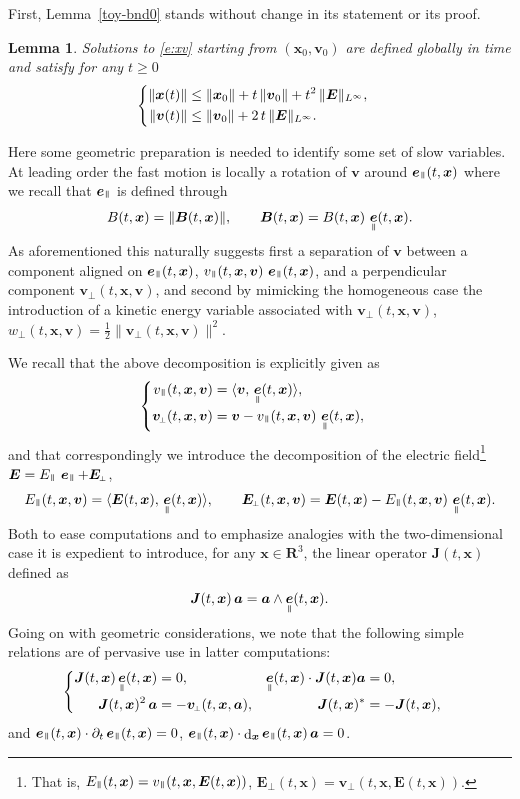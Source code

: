 \documentclass[JEP,XML,SOM,Unicode]{cedram}
\newenvironment{splitcases}
{\begin{cases}\begin{aligned}}
{\end{aligned}\end{cases}}
\newcommand{\sperp}{{\scriptscriptstyle\perp}}
\let\d\partial
\DeclareMathOperator\dD{d}\let\dd\dD
\theoremstyle{plain}
\newtheorem{lemma}[theorem]{Lemma}
\theoremstyle{definition}
\newcommand{\be}{\begin{equation}}
\newcommand{\ee}{\end{equation}}
\newcommand{\bl}{\begin{lemma}}
\newcommand{\el}{\end{lemma}}
\newcommand\R{\mathbf R}
\newcommand\bB{{\boldsymbol B}}
\newcommand\bE{{\boldsymbol E}}
\newcommand\bJ{{\boldsymbol J}}
\newcommand\bfa{{\boldsymbol a}}
\newcommand\bfv{{\boldsymbol v}}
\newcommand\bfx{{\boldsymbol x}}
\DeclareMathOperator{\beD}{\boldsymbol{e}}
\newcommand\eDpar{\beD_\mypar}
\newcommand\vpar{v_\mypar}
\newcommand\bvperp{\bfv_{\!\sperp}}
\newcommand\eperp{w_{\!\sperp}}
\newcommand\Epar{E_\mypar}
\newcommand\Eperp{\bE_{\!\sperp}}
\newcommand{\mypar}{{\mkern3mu\vphantom{\perp}\vrule depth 0pt\mkern2mu\vrule depth 0pt\mkern3mu}}
\begin{document}
First, Lemma~\ref{toy-bnd0} stands without change in its statement or its proof.

\bl\label{bnd0}
Solutions to \eqref{e:xv} starting from $(\bfx_0,\bfv_0)$ are defined
globally in time and satisfy for any $t\geq0$
\[
\begin{splitcases}
\|\bfx(t)\|&\leq \|\bfx_0\|
+t\,\|\bfv_0\|+t^2\,\|\bE\|_{L^\infty},
\\
\|\bfv(t)\| &\leq \|\bfv_0\|+2\,t\,\|\bE\|_{L^\infty}.
\end{splitcases}
\]
\el

Here some geometric preparation is needed to identify some set of slow variables. At leading order the fast motion is locally a rotation of $\bfv$ around $\eDpar(t,\bfx)$ where we recall that $\eDpar$ is defined through
\[
B(t,\bfx)=\|\bB(t,\bfx)\|,\qquad \bB(t,\bfx)=B(t,\bfx)\,\eDpar(t,\bfx).
\]
As aforementioned this naturally suggests first a separation of $\bfv$ between a component aligned on $\eDpar(t,\bfx)$, $\vpar(t,\bfx,\bfv)\,\eDpar(t,\bfx)$, and a perpendicular component $\bvperp(t,\bfx,\bfv)$, and second by mimicking the homogeneous case the introduction of a kinetic energy variable associated with $\bvperp(t,\bfx,\bfv)$, $\eperp(t,\bfx,\bfv)=\tfrac12\|\bvperp(t,\bfx,\bfv)\|^2$.

We recall that the above decomposition is explicitly given as
\[
\begin{splitcases}
\vpar(t,\bfx,\bfv) &=\langle\bfv,\,\eDpar(t,\bfx)\rangle,
\\
\bvperp(t,\bfx,\bfv)&=\bfv-\vpar(t,\bfx,\bfv)\,\eDpar(t,\bfx),
\end{splitcases}
\]
and that correspondingly we introduce the decomposition of the electric field\footnote{That is, $\Epar(t,\bfx)=\vpar(t,\bfx,\bE(t,\bfx))$, $\Eperp(t,\bfx)=\bvperp(t,\bfx,\bE(t,\bfx))$.} $\bE=\Epar\,\eDpar+\Eperp$,
\[
\Epar(t,\bfx,\bfv)=\langle\bE(t,\bfx),\,\eDpar(t,\bfx)\rangle,\qquad
\Eperp(t,\bfx,\bfv)=\bE(t,\bfx)-\Epar(t,\bfx,\bfv)\,\eDpar(t,\bfx).
\]
Both to ease computations and to emphasize analogies with the two-dimensional case it is expedient to introduce, for any $\bfx\in\R^3$, the linear operator $\bJ(t,\bfx)$ defined as
\[
\bJ(t,\bfx) \,\bfa= \bfa\wedge \eDpar(t,\bfx).
\]
Going on with geometric considerations, we note that the following simple relations are of pervasive use in latter computations:
\be\label{e:J}
\begin{splitcases}
\bJ(t,\bfx)\eDpar(t,\bfx)&=0,&
\eDpar(t,\bfx)\cdot\bJ(t,\bfx)\bfa&=0,
\\
\bJ(t,\bfx)^2\,\bfa&=-\bvperp(t,\bfx,\bfa),&
\bJ(t,\bfx)^*&=-\bJ(t,\bfx),
\end{splitcases}
\ee
and $\eDpar(t,\bfx)\cdot\d_t\eDpar(t,\bfx)=0$, $\eDpar(t,\bfx)\cdot\dD_\bfx\eDpar(t,\bfx)\,\bfa=0$.
\end{document}
